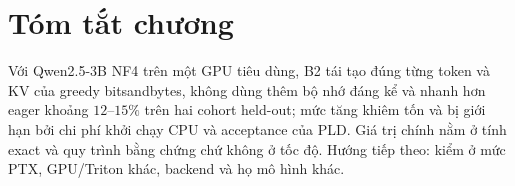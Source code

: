 \section{Tóm tắt chương}
Với Qwen2.5-3B NF4 trên một GPU tiêu dùng, B2 tái tạo đúng từng token và KV của greedy bitsandbytes, không dùng thêm bộ nhớ đáng kể và nhanh hơn eager khoảng $12$--$15\%$ trên hai cohort held-out; mức tăng khiêm tốn và bị giới hạn bởi chi phí khởi chạy CPU và acceptance của PLD. Giá trị chính nằm ở tính exact và quy trình bằng chứng chứ không ở tốc độ. Hướng tiếp theo: kiểm ở mức PTX, GPU/Triton khác, backend và họ mô hình khác.


